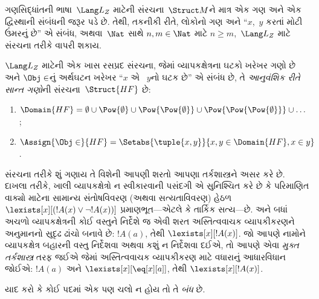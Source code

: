 \begin{ex}
ગણસિદ્ધાંતની ભાષા~$\Lang L_Z$ માટેની સંરચના~$\Struct M$ને માત્ર એક
ગણ અને એક દ્વિસ્થાની સંબંધની જરૂર પડે છે. તેથી, તકનીકી રીતે, લોકોનો
ગણ અને ``$x$,~$y$ કરતાં મોટી ઉંમરનું છે'' એ સંબંધ, અથવા~$\Nat$ સાથે
$n, m \in \Nat$ માટે $n \ge m$,~$\Lang L_Z$ માટે સંરચના
તરીકે વાપરી શકાય.

$\Lang L_Z$ માટેની એક ખાસ રસપ્રદ સંરચના, જેમાં વ્યાપકક્ષેત્રના
ઘટકો ખરેખર ગણો છે અને $\Obj \in$નું અર્થઘટન ખરેખર ``$x$ એ
~$y$નો ઘટક છે'' એ સંબંધ છે, તે \emph{આનુવંશિક રીતે સાન્ત
ગણો}ની સંરચના~$\Struct{{HF}}$ છે:
\begin{enumerate}
\item $\Domain{{{HF}}} = \emptyset \cup \Pow{\emptyset} \cup
  \Pow{\Pow{\emptyset}} \cup \Pow{\Pow{\Pow{\emptyset}}} \cup \dots$;
\item $\Assign{\Obj \in}{{{HF}}} = \Setabs{\tuple{x, y}}{x, y \in
  \Domain{{{HF}}}, x \in y}$.
\end{enumerate}
\end{ex}

\begin{digress}
સંરચના તરીકે શું ગણાય તે વિશેની આપણી શરતો આપણા તર્કશાસ્ત્રને
અસર કરે છે. દાખલા તરીકે, ખાલી વ્યાપકક્ષેત્રો ન સ્વીકારવાની પસંદગી એ સુનિશ્ચિત
કરે છે કે પરિમાણિત વાક્યો માટેના સામાન્ય સંતોષવિવરણ (અથવા
સત્યતાવિવરણ) હેઠળ $\lexists[x][(!A(x) \lor \lnot !A(x))]$
પ્રમાણભૂત---એટલે કે તાર્કિક સત્ય---છે. અને બધાં અચળો વ્યાપકક્ષેત્રની
કોઈ વસ્તુને નિર્દેશે જ એવી શરત અસ્તિત્વવાચક વ્યાપકીકરણને અનુમાનનો
સુદૃઢ ઢાંચો બનાવે છે: $!A(a)$, તેથી $\lexists[x][!A(x)]$. જો આપણે
નામોને વ્યાપકક્ષેત્ર બહારની વસ્તુ નિર્દેશવા અથવા કશું ન નિર્દેશવા દઈએ, તો
આપણે એવા \emph{મુક્ત તર્કશાસ્ત્ર} તરફ જઈએ જેમાં અસ્તિત્વવાચક
વ્યાપકીકરણ માટે વધારાનું આધારવિધાન જોઈએ: $!A(a)$ અને
$\lexists[x][\eq[x][a]]$, તેથી $\lexists[x][!A(x)]$.
\end{digress}
\endgroup


\begingroup
\makeatletter{}\makeatother


\label{guunit:OLP-0162}


\begin{explain}
યાદ કરો કે કોઈ પદમાં એક પણ ચલો ન હોય તો તે \emph{બંધ} છે.
\end{explain}

